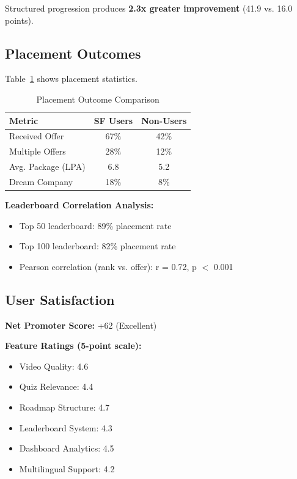 \documentclass[journal]{IEEEtran}
\begin{document}
Structured progression produces \textbf{2.3x greater improvement} (41.9 vs. 16.0 points).

\subsection{Placement Outcomes}

Table~\ref{tab:placement} shows placement statistics.

\begin{table}[htbp]
\caption{Placement Outcome Comparison}
\label{tab:placement}
\centering
\begin{tabular}{lcc}
\toprule
\textbf{Metric} & \textbf{SF Users} & \textbf{Non-Users} \\
\midrule
Received Offer & 67\% & 42\% \\
Multiple Offers & 28\% & 12\% \\
Avg. Package (LPA) & 6.8 & 5.2 \\
Dream Company & 18\% & 8\% \\
\bottomrule
\end{tabular}
\end{table}

\textbf{Leaderboard Correlation Analysis:}
\begin{itemize}
    \item Top 50 leaderboard: 89\% placement rate
    \item Top 100 leaderboard: 82\% placement rate
    \item Pearson correlation (rank vs. offer): r = 0.72, p $<$ 0.001
\end{itemize}

\subsection{User Satisfaction}

\textbf{Net Promoter Score:} +62 (Excellent)

\textbf{Feature Ratings (5-point scale):}
\begin{itemize}
    \item Video Quality: 4.6
    \item Quiz Relevance: 4.4
    \item Roadmap Structure: 4.7
    \item Leaderboard System: 4.3
    \item Dashboard Analytics: 4.5
    \item Multilingual Support: 4.2
\end{itemize}
\end{document}
